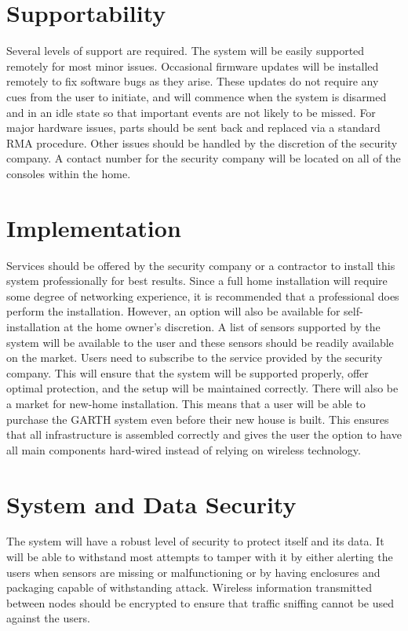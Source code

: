 \documentclass{report}
\begin{document}
\section{Supportability}
Several levels of support are required. The system will be easily supported
remotely for most minor issues. Occasional firmware updates will be installed
remotely to fix software bugs as they arise. These updates do not require any cues
from the user to initiate, and will commence when the system is disarmed and
in an idle state so that important events are not likely to be missed. For major hardware
issues, parts should be sent back and replaced via a standard RMA procedure. 
Other issues should be handled by the  discretion of the security company. A 
contact number for the security company will be located on all of the consoles 
within the home.

\section{Implementation}
Services should be offered by the security company or a contractor to install
this system professionally for best results. Since a full home installation will
require some degree of networking experience, it is recommended that a
professional does perform the installation. However, an option will also be available
for self-installation at the home owner's discretion. A list of sensors
supported by the system will be available to the user and these sensors should be
readily available on the market. Users need to subscribe to the service
provided by the security company. This will ensure that the system will be
supported properly, offer optimal protection, and the setup will be maintained
correctly. There will also be a market for new-home installation. This means that
a user will be able to purchase the GARTH system even before their new house is
built. This ensures that all infrastructure is assembled correctly and gives the user
the option to have all main components hard-wired instead of relying on wireless
technology.

\section{System and Data Security}
The system will have a robust level of security to protect itself and its data. It 
will be able to withstand most attempts to tamper with it by either alerting 
the users when sensors are missing or malfunctioning or by having enclosures and 
packaging capable of withstanding attack. Wireless information transmitted between 
nodes should be encrypted to ensure that traffic sniffing cannot be used against the
users.
\end{document}
